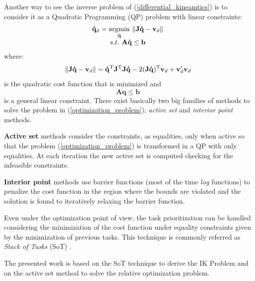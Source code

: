 Another way to see the inverse problem of (\ref{differential_kineamtics}) is to consider it as a Quadratic Programming (QP) problem with linear constraints:
\begin{equation} 
\label{optimization_problem}
\begin{array}{c}
\mathbf{\dot{q}}_d = \underset{\mathbf{\dot{q}}}{\operatorname{argmin}} \ \Arrowvert \mathbf{J} \mathbf{\dot{q}}-\mathbf{v}_d \Arrowvert\\
s.t. \ \mathbf{A}\mathbf{\dot{q}} \leq \mathbf{b}
\end{array}
\end{equation}
where: 
\begin{equation}
    \Arrowvert \mathbf{J} \mathbf{\dot{q}}-\mathbf{v}_d \Arrowvert = \mathbf{\dot{q}}^\text{T}\mathbf{J}^\text{T}\mathbf{J}\mathbf{\dot{q}} - 2(\mathbf{J}\mathbf{\dot{q}})^\text{T}\mathbf{v}_d+\mathbf{v}_d'\mathbf{v}_d
\end{equation}
is the quadratic cost function that is minimized and 
\begin{equation}
    \mathbf{A}\mathbf{\dot{q}} \leq \mathbf{b}
\end{equation}
is a general linear constraint. There exist basically two big families of methods to solve the problem in (\ref{optimization_problem}); \emph{active set} and \emph{interior point} methods. 

\textbf{Active set} methods consider the constraints, as equalities, only when active so that the problem (\ref{optimization_problem}) is transformed in a QP with only equalities. At each iteration the new active set is computed checking for the infeasible constraints.

\textbf{Interior point} methods use barrier functions (most of the time $log$ functions) to penalize the cost function in the region where the bounds are violated and the solution is found to iteratively relaxing the barrier function.

Even under the optimization point of view, the task prioritization can be handled considering the minimization of the cost function under equality constraints given by the minimization of previous tasks. This technique is commonly referred as \emph{Stack of Tasks} (SoT) \cite{Mansard:09}. 

The presented work is based on the SoT technique to derive the IK Problem and on the active set method to solve the relative optimization problem. 



